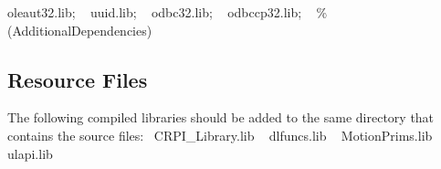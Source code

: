 oleaut32.\+lib; ~\newline
uuid.\+lib; ~\newline
odbc32.\+lib; ~\newline
odbccp32.\+lib; ~\newline
\%(Additional\+Dependencies) \hypertarget{index_rsrc}{}\subsection{Resource Files}\label{index_rsrc}
The following compiled libraries should be added to the same directory that contains the source files\+:~\newline
C\+R\+P\+I\+\_\+\+Library.\+lib ~\newline
dlfuncs.\+lib ~\newline
Motion\+Prims.\+lib ~\newline
ulapi.\+lib 
